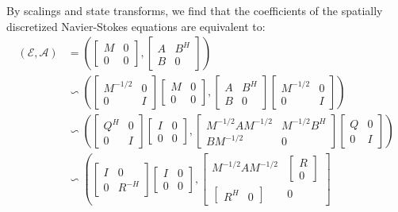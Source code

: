 \documentclass[]{book}
\theoremstyle{definition}
\theoremstyle{definition}
\theoremstyle{definition}
\theoremstyle{remark}
\begin{document}
By scalings and state transforms, we find that the coefficients of the spatially discretized Navier-Stokes equations are equivalent to:
\begin{align*}
(\mathcal E, \mathcal A) &=
\left(
\begin{bmatrix} M & 0 \\ 0 & 0 \end{bmatrix}
,
\begin{bmatrix} A & B^H \\ B & 0 \end{bmatrix}
\right) \\
& \backsim 
\left(
\begin{bmatrix} M^{-1/2} & 0 \\ 0 & I \end{bmatrix}
\begin{bmatrix} M & 0 \\ 0 & 0 \end{bmatrix}
,
\begin{bmatrix} A & B^H \\ B & 0 \end{bmatrix}
\begin{bmatrix} M^{-1/2} & 0 \\ 0 & I \end{bmatrix}
\right) \\
& \backsim 
\left(
\begin{bmatrix} Q^H & 0 \\ 0 & I \end{bmatrix}
\begin{bmatrix} I & 0 \\ 0 & 0 \end{bmatrix}
,
\begin{bmatrix} M^{-1/2}AM^{-1/2} &  M^{-1/2}B^H \\ B M^{-1/2} & 0 \end{bmatrix}
\begin{bmatrix} Q & 0 \\ 0 & I \end{bmatrix}
\right) \\
& \backsim 
\left(
\begin{bmatrix} I & 0 \\ 0 & R^{-H} \end{bmatrix}
\begin{bmatrix} I & 0 \\ 0 & 0 \end{bmatrix}
,
\begin{bmatrix} M^{-1/2}AM^{-1/2} &  \begin{bmatrix} R \\ 0 \end{bmatrix} \\ \begin{bmatrix}R^H & 0\end{bmatrix} & 0 \end{bmatrix}

\end{align*}
\end{document}
